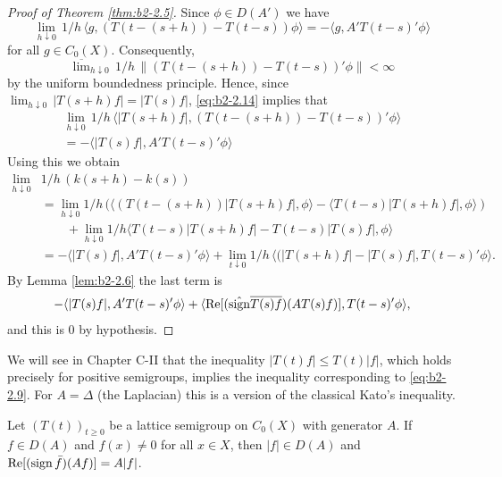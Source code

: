 \begin{proof}[Proof of Theorem \ref{thm:b2-2.5}]
Since $\phi \in D(A')$ we have
\begin{equation}\label{eq:b2-2.14}
\lim_{h \downarrow 0}\, 1/h\, \langle g,(T(t-(s+h)) - T(t-s))\phi \rangle = - \langle g,A'T(t-s)'\phi \rangle
\end{equation}
for all $g \in C_{0}(X)$.
Consequently,
\begin{equation*}
\overline{\lim}_{h \downarrow 0}\, 1/h\, \|(T(t-(s+h)) - T(t-s))'\phi\| < \infty
\end{equation*}
by the uniform boundedness principle.
Hence, since $\lim_{h \downarrow 0}\, |T(s+h)f| = |T(s)f|$, \eqref{eq:b2-2.14} implies that
\begin{equation}\label{eq:b2-2.15}
\begin{split}
\lim_{h \downarrow 0}\, 1/h\, \langle |T(s+h)f|,(T(t-(s+h)) - T(t-s))'\phi \rangle \\
= - \langle |T(s)f|,A'T(t-s)'\phi \rangle
\end{split}
\end{equation}
Using this we obtain
\begin{align*}
\lim_{h \downarrow 0} &1/h\, (k(s+h) - k(s)) \\
&= \lim_{h \downarrow 0} 1/h\, (\langle (T(t-(s+h))|T(s+h)f|,\phi \rangle - \langle T(t-s)|T(s+h)f|,\phi \rangle) \\
&\qquad + \lim_{h \downarrow 0} 1/h \langle T(t-s)|T(s+h)f| - T(t-s)|T(s)f|,\phi \rangle \\
&= -\langle |T(s)f|,A'T(t-s)'\phi \rangle + \lim_{t \downarrow 0} 1/h \, \langle (|T(s+h)f| -  |T(s)f| , T(t-s)'\phi \rangle .
\end{align*}
By Lemma \ref{lem:b2-2.6} the last term is
\begin{align*}
- \langle |T(s)f|,A'T(t-s)'\phi \rangle + \langle \mathop{}\!\mathrm{Re}[(\hat{\operatorname{sign}} \overline{T(s)f})(AT(s)f)],T(t-s)'\phi \rangle,
\end{align*}
and this is $0$ by hypothesis.
\end{proof}

\begin{remark}\label{rem:b2-2.7}
We will see in Chapter C-II that the inequality $|T(t)f| \leq T(t)|f|$, which holds precisely for positive semigroups, implies the inequality corresponding to \eqref{eq:b2-2.9}.
For $A = \Delta$ (the Laplacian) this is a version of the classical Kato's inequality.
\end{remark}
\begin{corollary}\label{cor:b2-2.8}
Let $(T(t))_{t \geq 0}$ be a lattice semigroup on $C_{0}(X)$ with generator $A$.
If $f \in D(A)$ and $f(x) \neq 0$ for all $x \in X$, then $|f| \in D(A)$ and $\mathop{}\!\mathrm{Re}[(\operatorname{sign} \bar{f})(Af)] = A|f|$.
\end{corollary}

